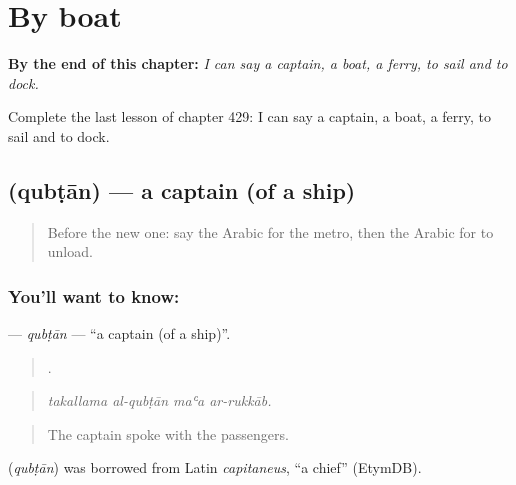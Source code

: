 
\chapter{By boat}
\label{ch:ar-by-boat}

\begin{chapteropening}
\textbf{By the end of this chapter:} \emph{I can say a captain, a boat, a ferry, to sail and to dock.}

Complete the last lesson of chapter 429: I can say a captain, a boat, a ferry, to sail and to dock.
\end{chapteropening}

\section[\texorpdfstring{\ar{قبطان} (qubṭān)}{قبطان (qubṭān)}]{ (qubṭān) — a captain (of a ship)}

\label{lesson:AR-C429-qubtan}



\begin{quote}
Before the new one: say the Arabic for the metro, then the Arabic for to unload.
\end{quote}

\subsection*{You'll want to know: }
\textbf{} — \emph{qubṭān} — \textquotedblleft{}a captain (of a ship)\textquotedblright{}.

\begin{quote}
   .
\end{quote}

\begin{quote}
\emph{takallama al-qubṭān maʿa ar-rukkāb.}
\end{quote}

\begin{quote}
The captain spoke with the passengers.
\end{quote}

\begin{cousinweb}
\textbf{} (\emph{qubṭān}) was borrowed from Latin \emph{capitaneus}, \textquotedblleft{}a chief\textquotedblright{} (EtymDB).
\end{cousinweb}

